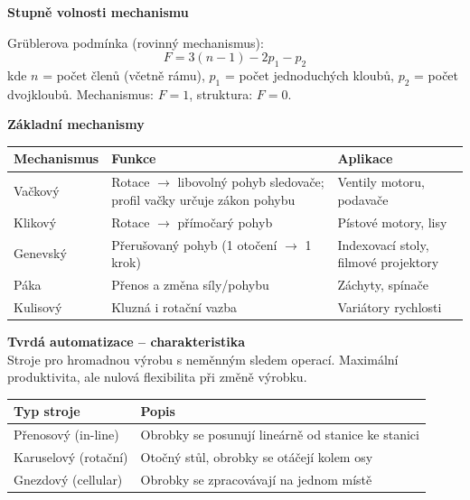 \documentclass[a4paper,10pt]{article}
\begin{document}
\begin{vysvetlenibox}
\textbf{Stupně volnosti mechanismu}

\begin{vzorcebox}
Grüblerova podmínka (rovinný mechanismus):
$$F = 3(n-1) - 2p_1 - p_2$$
kde $n$ = počet členů (včetně rámu), $p_1$ = počet jednoduchých kloubů,
$p_2$ = počet dvojkloubů. Mechanismus: $F=1$, struktura: $F=0$.
\end{vzorcebox}

\textbf{Základní mechanismy}

\begin{center}
\begin{tabularx}{0.95\linewidth}{@{} l X l @{}}
    \toprule
    \textbf{Mechanismus} & \textbf{Funkce} & \textbf{Aplikace} \\
    \midrule
    Vačkový      & Rotace $\to$ libovolný pohyb sledovače;
                   profil vačky určuje zákon pohybu & Ventily motoru, podavače \\
    Klikový       & Rotace $\to$ přímočarý pohyb & Pístové motory, lisy \\
    Genevský      & Přerušovaný pohyb (1 otočení $\to$ 1 krok)
                  & Indexovací stoly, filmové projektory \\
    Páka          & Přenos a změna síly/pohybu & Záchyty, spínače \\
    Kulisový      & Kluzná i rotační vazba & Variátory rychlosti \\
    \bottomrule
\end{tabularx}
\end{center}

\textbf{Tvrdá automatizace -- charakteristika}\\
Stroje pro hromadnou výrobu s neměnným sledem operací.
Maximální produktivita, ale nulová flexibilita při změně výrobku.

\begin{center}
\begin{tabularx}{0.95\linewidth}{@{} l X @{}}
    \toprule
    \textbf{Typ stroje} & \textbf{Popis} \\
    \midrule
    Přenosový (in-line) & Obrobky se posunují lineárně od stanice ke stanici \\
    Karuselový (rotační) & Otočný stůl, obrobky se otáčejí kolem osy \\
    Gnezdový (cellular)  & Obrobky se zpracovávají na jednom místě \\
    \bottomrule
\end{tabularx}
\end{center}
\end{vysvetlenibox}


\end{document}
